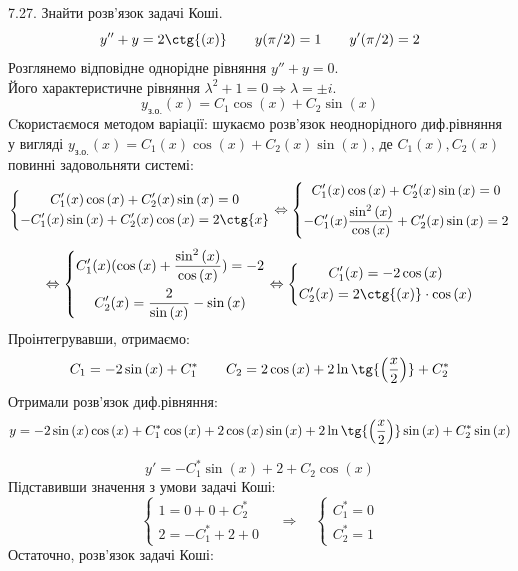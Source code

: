 \documentclass[14pt,a4paper]{scrartcl}
\theoremstyle{definition}
\theoremstyle{remark}
\theoremstyle{definition}
\theoremstyle{definition}
\begin{document}
7.27. Знайти розв'язок задачі Коші.
$$
y'' + y = 2 \ctg{(x)} \qquad y( \pi/2) = 1 \qquad y'(\pi/2) = 2
$$
Розглянемо відповідне однорідне рівняння $y'' + y = 0$. \\
Його характеристичне рівняння $\lambda^2 + 1 = 0 \Rightarrow \lambda = \pm i$.
$$
y_{\text{з.о.}} (x) = C_1 \cos{(x)} + C_2 \sin{(x)}
$$
Cкористаємося методом варіації: шукаємо розв’язок неоднорідного диф.рівняння у вигляді $ y_{\text{з.о.}} (x) = C_1(x) \cos{(x)} + C_2(x) \sin{(x)}   $, де $C_1 ( x ), C_2 ( x )$ повинні задовольняти системі:
$$
\left\lbrace
\begin{gathered}
 C_1'(x) \cos{(x)} + C_2'(x) \sin{(x)} =0 \\
 - C_1'(x) \sin{(x)} + C_2'(x)\cos{(x)} = 2 \ctg{x}
\end{gathered}
 \right.
 \Leftrightarrow
 \left\lbrace
 \begin{gathered}
  C_1'(x) \cos{(x)} + C_2'(x) \sin{(x)} =0 \\
  - C_1'(x) \frac{\sin^2{(x)}}{ \cos{(x)} }  + C_2'(x)\sin{(x)} = 2
 \end{gathered}
  \right.
$$
$$
\Leftrightarrow
\left\lbrace
\begin{gathered}
 C_1'(x) (\cos{(x)} + \frac{\sin^2{(x)}}{ \cos{(x)} }) = -2\\
 C_2'(x) = \frac{2}{ \sin{(x)} } - \sin{(x)}
\end{gathered}
 \right.
 \Leftrightarrow
 \left\lbrace
 \begin{gathered}
 C_1'(x) = -2 \cos{(x)}\\
 C_2'(x) =  2\ctg{(x)} \cdot \cos{(x)}
 \end{gathered}
  \right.
$$
Проінтегрувавши, отримаємо:
$$
C_1 = -2 \sin{(x)} + C^*_1 \qquad C_2 = 2 \cos{(x)} + 2 \ln{ \tg{\Big( \frac{x}{2} \Big)} } + C^*_2
$$
Отримали розв'язок диф.рівняння:
$$
y = -2 \sin{(x)} \cos{(x)} + C^*_1 \cos{(x)} + 2 \cos{(x)}\sin{(x)} + 2 \ln{\tg{\Big( \frac{x}{2} \Big)} }\sin{(x)} + C^*_2 \sin{(x)}
$$
\begin{center}
\end{center}
$$
y' = -C_1^*\sin{(x)} + 2 + C_2 \cos{(x)}
$$
Підставивши значення з умови задачі Коші:
$$
\left\lbrace
\begin{gathered}
 1 = 0 + 0 + C^*_2\\
 2 = - C^*_1 + 2 + 0
\end{gathered} \right.  \quad \Longrightarrow \quad
\left\lbrace
\begin{gathered}
  C_1^* =0\\
	C_2^* = 1
\end{gathered}
 \right.
$$
Остаточно, розв'язок задачі Коші:
\begin{center}
\end{center}
\end{document}
